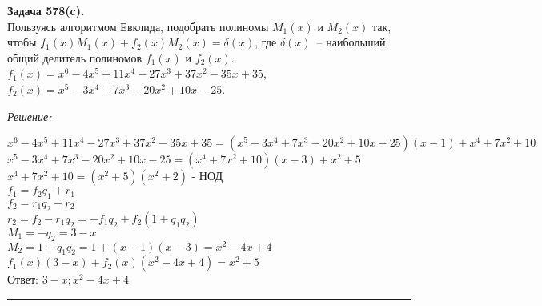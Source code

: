 \documentclass[a4paper, 12pt]{article}
\newenvironment{problem}[2][Задача]
    { \begin{mdframed}[backgroundcolor=gray!10] \textbf{#1 #2.} \\}
    {  \end{mdframed}}
\newenvironment{solution}
    {\textit{Решение: }}
    {\noindent\rule{7in}{1.5pt}}
\begin{document}
\begin{problem}{578(c)}
Пользуясь алгоритмом Евклида, подобрать полиномы $M_1(x)$ и $M_2(x)$ так,
чтобы $f_1(x)M_1(x)+f_2(x)M_2(x)=\delta(x)$, где $\delta(x)$~-- наибольший общий делитель полиномов $f_1(x)$ и $f_2(x)$.\\
$f_1(x)=x^6-4x^5+11x^4-27x^3+37x^2-35x+35$, \\ $f_2(x)=x^5-3x^4+7x^3-20x^2+10x-25$.
\end{problem}
\begin{solution}

$\displaystyle x^6-4x^5+11x^4-27x^3+37x^2-35x+35 = (x^5-3x^4+7x^3-20x^2+10x-25)(x - 1) + x^4 + 7x^2 + 10$
\\
$\displaystyle x^5-3x^4+7x^3-20x^2+10x-25 = (x^4 + 7x^2 + 10)(x - 3) + x^2 + 5$
\\
$\displaystyle x^4 + 7x^2 + 10 = (x^2 + 5)(x^2 + 2) \text{ - НОД}$
\\
$\displaystyle f_1 = f_2q_1 + r_1$
\\
$\displaystyle f_2 = r_1q_2 + r_2$
\\
$\displaystyle r_2 = f_2 - r_1q_2 = -f_1q_2 + f_2(1 + q_1q_2)$
\\
$\displaystyle M_1 = -q_2 = 3 - x$
\\
$\displaystyle M_2 = 1 + q_1q_2 = 1 + (x - 1)(x - 3) = x^2 - 4x + 4$
\\
$\displaystyle f_1(x)(3 - x) + f_2(x)(x^2 - 4x + 4) = x^2 + 5$
\\
Ответ: $\displaystyle 3 - x; x^2 - 4x + 4$

\end{solution}
\end{document}
